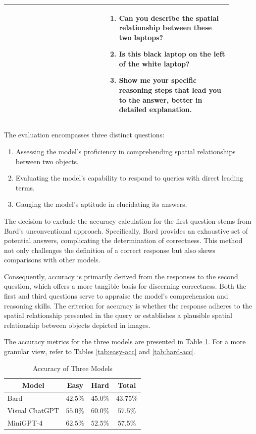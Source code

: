 \documentclass[journal,10pt]{IEEEtran}
\begin{document}
\begin{table}[ht]
\begin{tabular}{|p{0.4\linewidth}|p{0.5\linewidth}|}
        & \begin{enumerate}
            \item Can you describe the spatial relationship between these two laptops?
            \item Is this black laptop on the left of the white laptop?
            \item Show me your specific reasoning steps that lead you to the answer, better in detailed explanation.
        \end{enumerate}\\
        \hline
        \end{tabular}
\end{table}

The evaluation encompasses three distinct questions:
\begin{enumerate}
    \item Assessing the model's proficiency in comprehending spatial relationships between two objects.
    \item Evaluating the model's capability to respond to queries with direct leading terms.
    \item Gauging the model's aptitude in elucidating its answers.
\end{enumerate}
The decision to exclude the accuracy calculation for the first question stems from Bard's unconventional approach. Specifically, Bard provides an exhaustive set of potential answers, complicating the determination of correctness. This method not only challenges the definition of a correct response but also skews comparisons with other models.

Consequently, accuracy is primarily derived from the responses to the second question, which offers a more tangible basis for discerning correctness. Both the first and third questions serve to appraise the model's comprehension and reasoning skills. The criterion for accuracy is whether the response adheres to the spatial relationship presented in the query or establishes a plausible spatial relationship between objects depicted in images.

The accuracy metrics for the three models are presented in Table \ref{tab:accuracy}. For a more granular view, refer to Tables \ref{tab:easy-acc} and \ref{tab:hard-acc}.
\begin{table}[h]
    \centering
    \caption{Accuracy of Three Models}
    \label{tab:accuracy}
    \begin{tabular}{@{}lccc@{}}
    \toprule
    \multicolumn{1}{c}{Model} & Easy      & Hard & Total \\ \midrule
    Bard                      &  $42.5\%$ & $45.0\%$ &  $43.75\%$ \\
    Visual ChatGPT            &  $55.0\%$ & $60.0\%$ &  $57.5\%$  \\
    MiniGPT-4                 &  $62.5\%$ & $52.5\%$ &  $57.5\%$  \\ \bottomrule
    \end{tabular}
\end{table}
\end{document}
